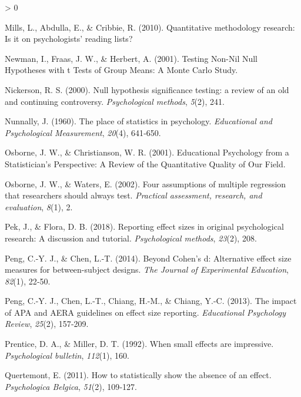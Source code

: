 \documentclass[
  12pt,
  french,
]{article}
\newlength{\cslhangindent}
\newenvironment{CSLReferences}[2] %
 {%
  \setlength{\parindent}{0pt}
  \ifodd #1 \everypar{\setlength{\hangindent}{\cslhangindent}}\ignorespaces\fi
  \ifnum #2 > 0
  \setlength{\parskip}{#2\baselineskip}
  \fi
 }%
 {}
\begin{document}
\begin{CSLReferences}{1}{0}
\leavevmode\hypertarget{ref-mills_quantitative_2010}{}%
Mills, L., Abdulla, E., \& Cribbie, R. (2010). Quantitative methodology
research: Is it on psychologists' reading lists?

\leavevmode\hypertarget{ref-newman_testing_2001}{}%
Newman, I., Fraas, J. W., \& Herbert, A. (2001). Testing Non-Nil Null
Hypotheses with t Tests of Group Means: A Monte Carlo Study.

\leavevmode\hypertarget{ref-nickerson_null_2000}{}%
Nickerson, R. S. (2000). Null hypothesis significance testing: a review
of an old and continuing controversy. \emph{Psychological methods},
\emph{5}(2), 241.

\leavevmode\hypertarget{ref-nunnally_place_1960}{}%
Nunnally, J. (1960). The place of statistics in psychology.
\emph{Educational and Psychological Measurement}, \emph{20}(4), 641‑650.

\leavevmode\hypertarget{ref-osborne_educational_2001}{}%
Osborne, J. W., \& Christianson, W. R. (2001). Educational Psychology
from a Statistician's Perspective: A Review of the Quantitative Quality
of Our Field.

\leavevmode\hypertarget{ref-osborne_four_2002}{}%
Osborne, J. W., \& Waters, E. (2002). Four assumptions of multiple
regression that researchers should always test. \emph{Practical
assessment, research, and evaluation}, \emph{8}(1), 2.

\leavevmode\hypertarget{ref-pek_reporting_2018}{}%
Pek, J., \& Flora, D. B. (2018). Reporting effect sizes in original
psychological research: A discussion and tutorial. \emph{Psychological
methods}, \emph{23}(2), 208.

\leavevmode\hypertarget{ref-peng_beyond_2014}{}%
Peng, C.-Y. J., \& Chen, L.-T. (2014). Beyond Cohen's d: Alternative
effect size measures for between-subject designs. \emph{The Journal of
Experimental Education}, \emph{82}(1), 22‑50.

\leavevmode\hypertarget{ref-peng_impact_2013}{}%
Peng, C.-Y. J., Chen, L.-T., Chiang, H.-M., \& Chiang, Y.-C. (2013). The
impact of {APA} and {AERA} guidelines on effect size reporting.
\emph{Educational Psychology Review}, \emph{25}(2), 157‑209.

\leavevmode\hypertarget{ref-prentice_when_1992}{}%
Prentice, D. A., \& Miller, D. T. (1992). When small effects are
impressive. \emph{Psychological bulletin}, \emph{112}(1), 160.

\leavevmode\hypertarget{ref-quertemont_how_2011}{}%
Quertemont, E. (2011). How to statistically show the absence of an
effect. \emph{Psychologica Belgica}, \emph{51}(2), 109‑127.


\end{CSLReferences}
\end{document}
